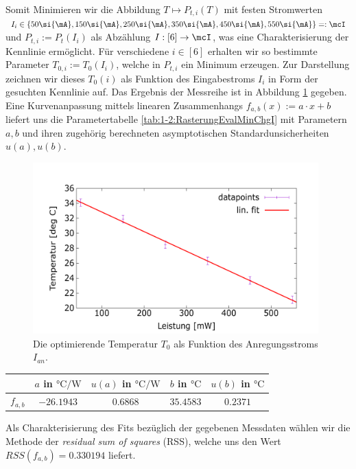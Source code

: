 \documentclass[../../main.tex]{subfiles}
\begin{document}
    Somit Minimieren wir die Abbildung $T\mapsto P_{t,i}(T)$ mit festen Stromwerten $I_i\in\{50\si{\mA},150\si{\mA},250\si{\mA},350\si{\mA},450\si{\mA},550\si{\mA}\}=:\mcI$ und $P_{t,i}:=P_t(I_i)$ als Abzählung $I:[6]\to\mcI$, was eine Charakterisierung der Kennlinie ermöglicht. Für verschiedene $i\in[6]$ erhalten wir so bestimmte Parameter $T_{0,i}:=T_0(I_i)$, welche in $P_{t,i}$ ein Minimum erzeugen. Zur Darstellung zeichnen wir dieses $T_0(i)$ als Funktion des Eingabestroms $I_i$ in Form der gesuchten Kennlinie auf. Das Ergebnis der Messreihe ist in Abbildung \ref{fig:1-2:RasterungEvalMinChgI} gegeben. Eine Kurvenanpassung mittels linearen Zusammenhangs $f_{a,b}(x) := a\cdot x + b$ liefert uns die Parametertabelle \ref{tab:1-2:RasterungEvalMinChgI} mit Parametern $a,b$ und ihren zugehörig berechneten asymptotischen Standardunsicherheiten $u(a),u(b)$.

    \begin{figure}[H]
        \centering
        \includegraphics[width=11cm]{../../Bilddateien/1-2/Rasterung_EvalMin_chgI.png}
        \caption{Die optimierende Temperatur $T_0$ als Funktion des Anregungsstroms $I_{\textit{an}}$.}
        \label{fig:1-2:RasterungEvalMinChgI}
    \end{figure}

    \begin{table}[H]
        \centering
        \begin{tabular}{c|cc|cc}
            \hline
            & $a$ in $\si{\celsius\per\W}$ & $u(a)$ in $\si{\celsius\per\W}$ & $b$ in $\si{\celsius}$ & $u(b)$ in $\si{\celsius}$ \\
            \hline\hline
            $f_{a,b}$ & $-26.1943$ & $0.6868$ & $35.4583$ & $0.2371$ \\
            \hline
        \end{tabular}
    \end{table}
    Als Charakterisierung des Fits bezüglich der gegebenen Messdaten wählen wir die Methode der \emph{residual sum of squares} (RSS), welche uns den Wert $RSS(f_{a,b}) = 0.330194$ liefert. 
\end{document}
